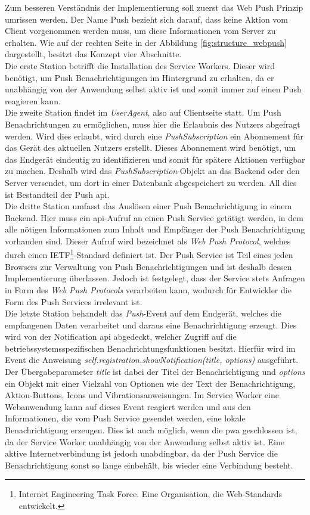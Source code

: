 Zum besseren Verständnis der Implementierung soll zuerst das Web Push Prinzip umrissen werden.
Der Name Push bezieht sich darauf, dass keine Aktion vom Client vorgenommen werden muss, um diese Informationen vom Server zu erhalten.
Wie auf der rechten Seite in der Abbildung \ref{fig:structure_webpush} dargestellt, besitzt das Konzept vier Abschnitte.\\
Die erste Station betrifft die Installation des Service Workers.
Dieser wird benötigt, um Push Benachrichtigungen im Hintergrund zu erhalten, da er unabhängig von der Anwendung selbst aktiv ist und somit immer auf einen Push reagieren kann.\\
Die zweite Station findet im \textit{UserAgent}, also auf Clientseite statt.
Um Push Benachrichtungen zu ermöglichen, muss hier die Erlaubnis des Nutzers abgefragt werden.
Wird dies erlaubt, wird durch eine \textit{PushSubscription} ein Abonnement für das Gerät des aktuellen Nutzers erstellt.
Dieses Abonnement wird benötigt, um das Endgerät eindeutig zu identifizieren und somit für spätere Aktionen verfügbar zu machen.
Deshalb wird das \textit{PushSubscription}-Objekt an das Backend oder den Server versendet, um dort in einer Datenbank abgespeichert zu werden.
All dies ist Bestandteil der Push \ac{api}.\\
Die dritte Station umfasst das Auslösen einer Push Benachrichtigung in einem Backend.
Hier muss ein \ac{api}-Aufruf an einen Push Service getätigt werden, in dem alle nötigen Informationen zum Inhalt und Empfänger der Push Benachrichtigung vorhanden sind.
Dieser Aufruf wird bezeichnet als \textit{Web Push Protocol}, welches durch einen IETF\footnote{Internet Engineering Task Force. Eine Organisation, die Web-Standards entwickelt.}-Standard definiert ist.
Der Push Service ist Teil eines jeden Browsers zur Verwaltung von Push Benachrichtigungen und ist deshalb dessen Implementierung überlassen.
Jedoch ist festgelegt, dass der Service stets Anfragen in Form des \textit{Web Push Protocols} verarbeiten kann, wodurch für Entwickler die Form des Push Services irrelevant ist.\\
Die letzte Station behandelt das \textit{Push}-Event auf dem Endgerät, welches die empfangenen Daten verarbeitet und daraus eine Benachrichtigung erzeugt.
Dies wird von der Notification \ac{api} abgedeckt, welcher Zugriff auf die betriebssystemsspezifischen Benachrichtungsfunktionen besitzt.
Hierfür wird im Event die Anweisung \textit{self.registration.showNoti\-fication(title, options)} ausgeführt.
Der Übergabeparameter \textit{title} ist dabei der Titel der Benachrichtigung und \textit{options} ein Objekt mit einer Vielzahl von Optionen wie der Text der Benachrichtigung, Aktion-Buttons, Icons und Vibrationsanweisungen.%
Im Service Worker eine Webanwendung kann auf dieses Event reagiert werden und aus den Informationen, die vom Push Service gesendet werden, eine lokale Benachrichtigung erzeugen.
Dies ist auch möglich, wenn die \ac{pwa} geschlossen ist, da der Service Worker unabhängig von der Anwendung selbst aktiv ist.
Eine aktive Internetverbindung ist jedoch unabdingbar, da der Push Service die Benachrichtigung sonst so lange einbehält, bis wieder eine Verbindung besteht.


